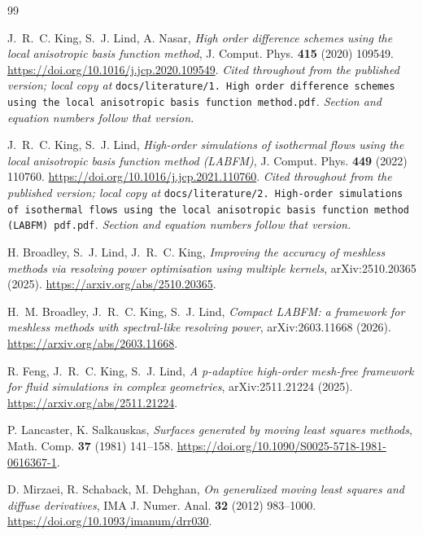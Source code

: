 \documentclass[11pt,a4paper]{article}
\begin{document}
\begin{thebibliography}{99}

J.~R.~C. King, S.~J. Lind, A. Nasar,
\emph{High order difference schemes using the local anisotropic basis function method},
J. Comput. Phys. \textbf{415} (2020) 109549.
\url{https://doi.org/10.1016/j.jcp.2020.109549}.
\newline\emph{Cited throughout from the published version; local copy at}
\texttt{docs/literature/1.\,High order difference schemes using the local anisotropic
basis function method.pdf}\emph{. Section and equation numbers follow that version.}

J.~R.~C. King, S.~J. Lind,
\emph{High-order simulations of isothermal flows using the local anisotropic basis
function method (LABFM)},
J. Comput. Phys. \textbf{449} (2022) 110760.
\url{https://doi.org/10.1016/j.jcp.2021.110760}.
\newline\emph{Cited throughout from the published version; local copy at}
\texttt{docs/literature/2.\,High-order simulations of isothermal flows using the local
anisotropic basis function method (LABFM) pdf.pdf}\emph{. Section and equation numbers
follow that version.}

H. Broadley, S.~J. Lind, J.~R.~C. King,
\emph{Improving the accuracy of meshless methods via resolving power optimisation using
multiple kernels}, arXiv:2510.20365 (2025).
\url{https://arxiv.org/abs/2510.20365}.

H.~M. Broadley, J.~R.~C. King, S.~J. Lind,
\emph{Compact LABFM: a framework for meshless methods with spectral-like resolving
power}, arXiv:2603.11668 (2026).
\url{https://arxiv.org/abs/2603.11668}.

R. Feng, J.~R.~C. King, S.~J. Lind,
\emph{A p-adaptive high-order mesh-free framework for fluid simulations in complex
geometries}, arXiv:2511.21224 (2025).
\url{https://arxiv.org/abs/2511.21224}.

P. Lancaster, K. Salkauskas,
\emph{Surfaces generated by moving least squares methods},
Math. Comp. \textbf{37} (1981) 141--158.
\url{https://doi.org/10.1090/S0025-5718-1981-0616367-1}.

D. Mirzaei, R. Schaback, M. Dehghan,
\emph{On generalized moving least squares and diffuse derivatives},
IMA J. Numer. Anal. \textbf{32} (2012) 983--1000.
\url{https://doi.org/10.1093/imanum/drr030}.


\end{thebibliography}
\end{document}
